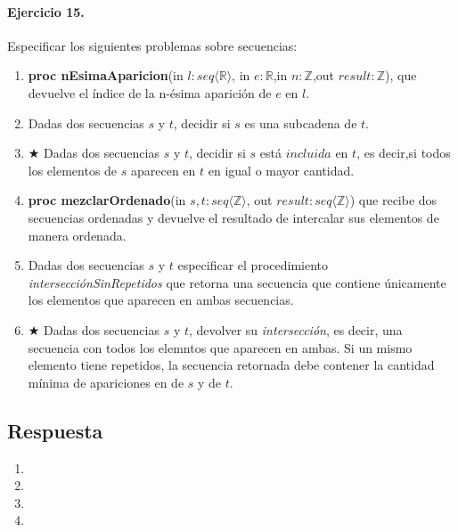 \documentclass[a4paper]{article}
\begin{document}
\paragraph*{Ejercicio 15.} Especificar los siguientes problemas sobre secuencias:
	\begin{enumerate}[label=\alph*)]
		\item \textbf{proc nEsimaAparicion}(in $l:seq\langle \mathbb{R}\rangle$,
			in $e:\mathbb{R}$,in $n:\mathbb{Z}$,out $result:\mathbb{Z}$), que devuelve
			el índice de la n-ésima aparición de $e$ en $l$.
		\item Dadas dos secuencias $s$ y $t$, decidir si $s$ es una subcadena de $t$.
		\item $\bigstar$ Dadas dos secuencias $s$ y $t$, decidir si $s$ está $incluida$ 
		en $t$, es decir,si todos los elementos de $s$ aparecen en $t$ en igual o mayor cantidad.
		\item \textbf{proc mezclarOrdenado}(in $s,t:seq\langle \mathbb{Z}\rangle$,
		out $result:seq\langle \mathbb{Z}\rangle$) que recibe dos secuencias ordenadas y devuelve
			el resultado de intercalar sus elementos de manera ordenada.
		\item Dadas dos secuencias $s$ y $t$ especificar el procedimiento 
				\textit{intersecciónSinRepetidos} que retorna una secuencia que contiene
				únicamente los elementos que aparecen en ambas secuencias.
		\item $\bigstar$ Dadas dos secuencias $s$ y $t$, devolver su \textit{intersección}, es
				decir, una secuencia con todos los elemntos que aparecen en ambas. Si un mismo
				elemento tiene repetidos, la secuencia retornada debe contener la cantidad
				mínima de apariciones en de $s$ y de $t$.
	\end{enumerate}
\subsection*{Respuesta}
	\begin{enumerate}[label=\alph*)]
		\item
		\item
		\item
		\item
	\end{enumerate}
	
\end{document}
